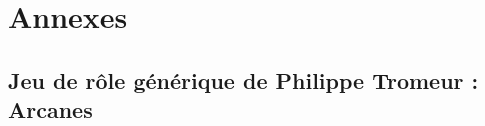 \documentclass[11pt,twoside,a5paper]{book}
\begin{document}

\section{Annexes}

\subsection{Jeu de r{\^o}le g{\'e}n{\'e}rique de Philippe Tromeur : Arcanes}
\end{document}
